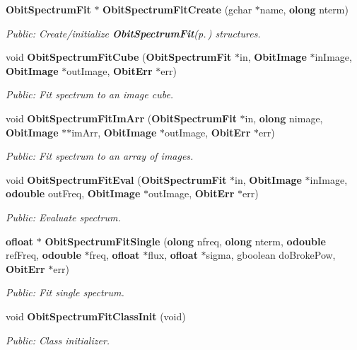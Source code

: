 \begin{CompactItemize}
{\bf Obit\-Spectrum\-Fit} $\ast$ {\bf Obit\-Spectrum\-Fit\-Create} (gchar $\ast$name, {\bf olong} nterm)
\begin{CompactList}\small\item\em Public: Create/initialize {\bf Obit\-Spectrum\-Fit}{\rm (p.\,\pageref{structObitSpectrumFit})} structures. \item\end{CompactList}\item 
void {\bf Obit\-Spectrum\-Fit\-Cube} ({\bf Obit\-Spectrum\-Fit} $\ast$in, {\bf Obit\-Image} $\ast$in\-Image, {\bf Obit\-Image} $\ast$out\-Image, {\bf Obit\-Err} $\ast$err)
\begin{CompactList}\small\item\em Public: Fit spectrum to an image cube. \item\end{CompactList}\item 
void {\bf Obit\-Spectrum\-Fit\-Im\-Arr} ({\bf Obit\-Spectrum\-Fit} $\ast$in, {\bf olong} nimage, {\bf Obit\-Image} $\ast$$\ast$im\-Arr, {\bf Obit\-Image} $\ast$out\-Image, {\bf Obit\-Err} $\ast$err)
\begin{CompactList}\small\item\em Public: Fit spectrum to an array of images. \item\end{CompactList}\item 
void {\bf Obit\-Spectrum\-Fit\-Eval} ({\bf Obit\-Spectrum\-Fit} $\ast$in, {\bf Obit\-Image} $\ast$in\-Image, {\bf odouble} out\-Freq, {\bf Obit\-Image} $\ast$out\-Image, {\bf Obit\-Err} $\ast$err)
\begin{CompactList}\small\item\em Public: Evaluate spectrum. \item\end{CompactList}\item 
{\bf ofloat} $\ast$ {\bf Obit\-Spectrum\-Fit\-Single} ({\bf olong} nfreq, {\bf olong} nterm, {\bf odouble} ref\-Freq, {\bf odouble} $\ast$freq, {\bf ofloat} $\ast$flux, {\bf ofloat} $\ast$sigma, gboolean do\-Broke\-Pow, {\bf Obit\-Err} $\ast$err)
\begin{CompactList}\small\item\em Public: Fit single spectrum. \item\end{CompactList}\item 
void {\bf Obit\-Spectrum\-Fit\-Class\-Init} (void)
\begin{CompactList}\small\item\em Public: Class initializer. \item\end{CompactList}\end{CompactItemize}


